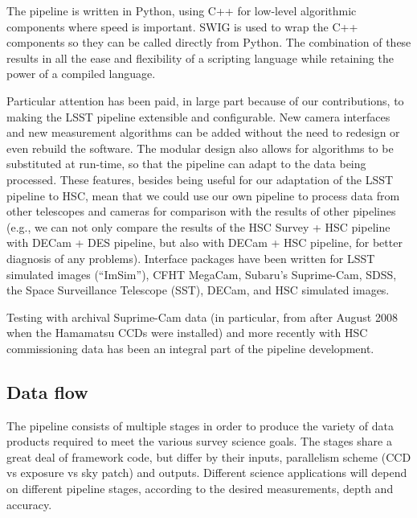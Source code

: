 \documentclass[12pt]{article}
\begin{document}
The pipeline is written in Python, using C++ for low-level algorithmic components where speed is important.
SWIG is used to wrap the C++ components so they can be called directly from Python.  The combination of these
results in all the ease and flexibility of a scripting language while retaining the power of a compiled
language.

Particular attention has been paid, in large part because of our contributions, to making the LSST pipeline
extensible and configurable.  New camera interfaces and new measurement algorithms can be added without the
need to redesign or even rebuild the software.  The modular design also allows for algorithms to be
substituted at run-time, so that the pipeline can adapt to the data being processed.  These features, besides
being useful for our adaptation of the LSST pipeline to HSC, mean that we could use our own pipeline to
process data from other telescopes and cameras for comparison with the results of other pipelines (e.g., we
can not only compare the results of the HSC Survey + HSC pipeline with DECam + DES pipeline, but also with
DECam + HSC pipeline, for better diagnosis of any problems).  Interface packages have been written for LSST
simulated images (``ImSim''), CFHT MegaCam, Subaru's Suprime-Cam, SDSS, the Space Surveillance Telescope
(SST), DECam, and HSC simulated images.

Testing with archival Suprime-Cam data (in particular, from after August 2008 when the Hamamatsu CCDs were
installed) and more recently with HSC commissioning data has been an integral part of the pipeline development.

\subsection{Data flow}

The pipeline consists of multiple stages in order to produce the variety of data products required to meet the
various survey science goals.  The stages share a great deal of framework code, but differ by their inputs,
parallelism scheme (CCD vs exposure vs sky patch) and outputs.  Different science applications will depend on
different pipeline stages, according to the desired measurements, depth and accuracy.
\end{document}
